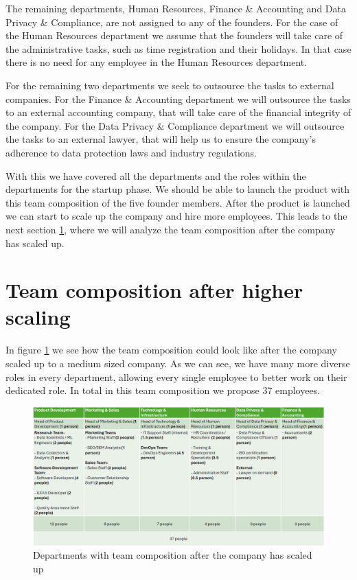 \p
The remaining departments, Human Resources, Finance \& Accounting and Data Privacy \& Compliance, are not assigned to any of the founders.
For the case of the Human Resources department we assume that the founders will take care of the administrative tasks, such as time registration and their holidays.
In that case there is no need for any employee in the Human Resources department.

\p
For the remaining two departments we seek to outsource the tasks to external companies.
For the Finance \& Accounting department we will outsource the tasks to an external accounting company, that will take care of the financial integrity of the company.
For the Data Privacy \& Compliance department we will outsource the tasks to an external lawyer, that will help us to ensure the company's adherence to data protection laws and industry regulations.

\p
With this we have covered all the departments and the roles within the departments for the startup phase.
We should be able to launch the product with this team composition of the five founder members.
After the product is launched we can start to scale up the company and hire more employees.
This leads to the next section \ref{sec:team_comp_highscaled}, where we will analyze the team composition after the company has scaled up.

\section{Team composition after higher scaling}
\label{sec:team_comp_highscaled}

In figure \ref{fig:team_comp_highscaled} we see how the team composition could look like after the company scaled up to a medium sized company.
As we can see, we have many more diverse roles in every department, allowing every single employee to better work on their dedicated role.
In total in this team composition we propose 37 employees.

\begin{figure}[H]
    \centering
    \includegraphics[width=\textwidth]{figures/team_comp_highscaled.png}
    \caption{Departments with team composition after the company has scaled up}
    \label{fig:team_comp_highscaled}
\end{figure}

